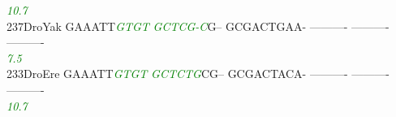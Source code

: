 \documentclass[11pt,twoside,reqno,a4paper]{article}
\begin{document}
{\hspace*{4\charwidth}\hspace*{7\charwidth}\hspace*{6\charwidth}\textit{\textcolor{Green}{10.7}}\hspace*{1\charwidth}\hspace*{1\charwidth}\hspace*{1\charwidth}\hspace*{1\charwidth}\hspace*{1\charwidth}\hspace*{1\charwidth}\\
237\hspace*{1\charwidth}DroYak	GAAATT\textit{\textcolor{Green}{G}}\textit{\textcolor{Green}{T}}\textit{\textcolor{Green}{G}}\textit{\textcolor{Green}{T}}	\textit{\textcolor{Green}{G}}\textit{\textcolor{Green}{C}}\textit{\textcolor{Green}{T}}\textit{\textcolor{Green}{C}}\textit{\textcolor{Green}{G}}\textit{\textcolor{Green}{-}}\textit{\textcolor{Green}{C}}G--	GCGACTGAA-	----------	----------	----------	\\
\hspace*{4\charwidth}\hspace*{7\charwidth}\hspace*{6\charwidth}\textit{\textcolor{Green}{7.5}}\hspace*{1\charwidth}\hspace*{1\charwidth}\hspace*{1\charwidth}\hspace*{1\charwidth}\hspace*{1\charwidth}\hspace*{1\charwidth}\\
233\hspace*{1\charwidth}DroEre	GAAATT\textit{\textcolor{Green}{G}}\textit{\textcolor{Green}{T}}\textit{\textcolor{Green}{G}}\textit{\textcolor{Green}{T}}	\textit{\textcolor{Green}{G}}\textit{\textcolor{Green}{C}}\textit{\textcolor{Green}{T}}\textit{\textcolor{Green}{C}}\textit{\textcolor{Green}{T}}\textit{\textcolor{Green}{G}}CG--	GCGACTACA-	----------	----------	----------	\\
\hspace*{4\charwidth}\hspace*{7\charwidth}\hspace*{6\charwidth}\textit{\textcolor{Green}{10.7}}\hspace*{1\charwidth}\hspace*{1\charwidth}\hspace*{1\charwidth}\hspace*{1\charwidth}\hspace*{1\charwidth}\hspace*{1\charwidth}\\
}
\end{document}

